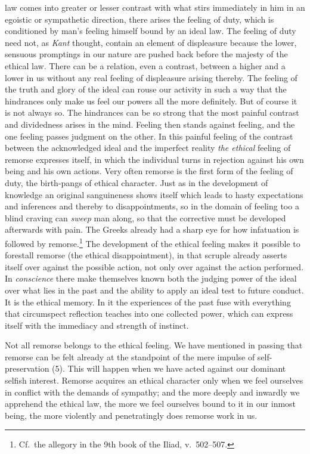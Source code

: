 \documentclass[12pt,a4paper]{book}
\newcommand{\opage}[1]{\marginnote{\footnotesize\textit{[#1]}}}
\begin{document}
law comes into greater or lesser contrast with what stirs immediately in
him in an egoistic or sympathetic direction, there arises the feeling of
duty, which is conditioned by man's feeling himself bound by an ideal
law. The feeling of duty need not, as \emph{Kant} thought, contain an
element of displeasure because the lower, sensuous promptings in our
nature are pushed back before the majesty of the ethical law. There can
be a relation, even a contrast, between a higher and a lower in us
without any real feeling of displeasure arising thereby. The feeling of
the truth and glory of the ideal can rouse our activity in such a way
that the hindrances only make us feel our powers all the more
definitely. But of course it is not always so.
\opage{311}The hindrances can be so strong that the most painful
contrast and dividedness arises in the mind. Feeling then stands against
feeling, and the one feeling passes judgment on the other. In this
painful feeling of the contrast between the acknowledged ideal and the
imperfect reality \emph{the ethical} feeling of remorse expresses
itself, in which the individual turns in rejection against his own being
and his own actions. Very often remorse is the first form of the feeling
of duty, the birth-pangs of ethical character. Just as in the
development of knowledge an original sanguineness shows itself which
leads to hasty expectations and inferences and thereby to
disappointments, so in the domain of feeling too a blind craving can
\emph{sweep} man along, so that the corrective must be developed
afterwards with pain. The Greeks already had a sharp eye for how
infatuation is followed by remorse.\footnote{Cf.\ the allegory in the
9th book of the Iliad, v.~502--507.} The development of the ethical
feeling makes it possible to forestall remorse (the ethical
disappointment), in that scruple already asserts itself over against the
possible action, not only over against the action performed. In
\emph{conscience} there make themselves known both the judging power of
the ideal over what lies in the past and the ability to apply an ideal
test to future conduct. It is the ethical memory. In it the experiences
of the past fuse with everything that circumspect reflection teaches
into one collected power, which can express itself with the immediacy
and strength of instinct.

Not all remorse belongs to the ethical feeling. We have mentioned in
passing that remorse can be felt already at the standpoint of the mere
impulse of self-preservation (5). This will happen when we have acted
against our dominant selfish interest. Remorse acquires an ethical
character only when we feel ourselves in conflict with the demands of
sympathy; and the more deeply and inwardly we apprehend the ethical law,
the more we feel ourselves bound to it in our inmost being, the more
violently and penetratingly does remorse work in us.
\end{document}
